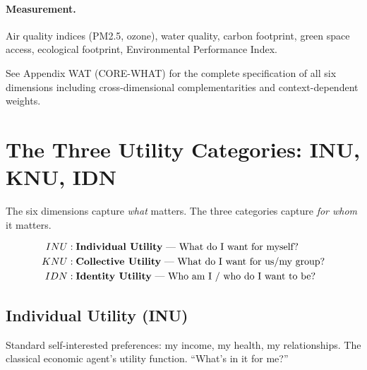 \paragraph{Measurement.}
Air quality indices (PM2.5, ozone), water quality, carbon footprint,
green space access, ecological footprint, Environmental Performance Index.

\begin{cross-reference}
See Appendix WAT (CORE-WHAT) for the complete specification of all six dimensions
including cross-dimensional complementarities and context-dependent weights.
\end{cross-reference}



\section{The Three Utility Categories: INU, KNU, IDN}
\label{sec:fepsde-categories}


The six dimensions capture \emph{what} matters.
The three categories capture \emph{for whom} it matters.

\begin{definition}
\label{def:utility-categories}
\begin{align}
  INU &: \text{\textbf{Individual Utility} --- What do I want for myself?} \\
  KNU &: \text{\textbf{Collective Utility} --- What do I want for us/my group?} \\
  IDN &: \text{\textbf{Identity Utility} --- Who am I / who do I want to be?}
\end{align}
\end{definition}

\subsection{Individual Utility (INU)}
\label{sec:fepsde-inu}

\begin{definition}
Standard self-interested preferences: my income, my health, my relationships.
The classical economic agent's utility function. ``What's in it for me?''
\end{definition}

